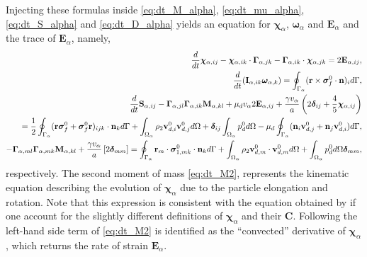 Injecting these formulas inside \ref{eq:dt_M_alpha}, \ref{eq:dt_mu_alpha}, \ref{eq:dt_S_alpha} and \ref{eq:dt_D_alpha}  yields an equation for $\bm\chi_\alpha$, $\bm\omega_\alpha$ and $\textbf{E}_\alpha$ and the trace of $\textbf{E}_\alpha$, namely,
\begin{align}
    \ddt \bm\chi_{\alpha,ij}
    -\bm\chi_{\alpha,ik} \cdot \bm\Gamma_{\alpha,jk}
    - \bm\Gamma_{\alpha,ik} \cdot \bm\chi_{\alpha,jk}
    =
    2\textbf{E}_{\alpha,ij},
    \label{eq:dt_M2}
    \\
    \ddt (\textbf{I}_{\alpha,ik}\bm\omega_{\alpha,k} )
    = 
    \intS{(\textbf{r}\times\bm\sigma_f^0\cdot \textbf{n})_i},
    \label{eq:dt_mu2}
    \\
    \ddt \textbf{S}_{\alpha,ij}
    -  \bm\Gamma_{\alpha,jl}\bm\Gamma_{\alpha,ik} \textbf{M}_{\alpha,kl}  
    + \mu_d v_\alpha 2\textbf{E}_{\alpha,ij}
    + \frac{\gamma v_\alpha }{a} \left(
    2\bm\delta_{ij} 
    + \frac{4 }{5} \bm\chi_{\alpha,ij}
    \right)\nonumber\\
    = 
    \frac{1}{2}\intS{(\textbf{r}\bm\sigma_f^0 + \bm\sigma_f^0\textbf{r})_{ijk}\cdot \textbf{n}_k} 
    + \intO{\rho_2 \textbf{v}_{d,i}^0\textbf{v}_{d,j}^0}
    + \bm\delta_{ij}\intO{p_d^0} 
    - \mu_d \intS{(\textbf{n}_i \textbf{v}_{d,j}^0 + \textbf{n}_j \textbf{v}_{d,i}^0)},
    \label{eq:dt_S2}
    \\
    \label{eq:dt_trM2}
    -  \bm\Gamma_{\alpha,ml}\bm\Gamma_{\alpha,mk} \textbf{M}_{\alpha,kl}  
    + \frac{\gamma v_\alpha }{a} 
    \left[
    2\bm\delta_{mm} 
    \right]
    = 
    \intS{\textbf{r}_m\cdot\bm\sigma_{1,mk}^0\cdot \textbf{n}_k} 
    + \intO{\rho_2 \textbf{v}_{d,m}^0\cdot \textbf{v}_{d,m}^0}
    + \intO{p_d^0} \bm\delta_{mm},
\end{align}
respectively. 
The second moment of mass \ref{eq:dt_M2}, represents the kinematic equation describing the evolution of $\bm\chi_\alpha$ due to the particle elongation and rotation. 
Note that this expression is consistent with the equation obtained by \citet{goddard1967nonlinear} if one account for the slightly different definitions of $\bm\chi_\alpha$ and their \textbf{C}.
Following \citet{goddard1967nonlinear} the left-hand side term of \ref{eq:dt_M2} is identified as the ``convected'' derivative of $\bm\chi_\alpha$, which returns the rate of strain $\textbf{E}_\alpha$. 
